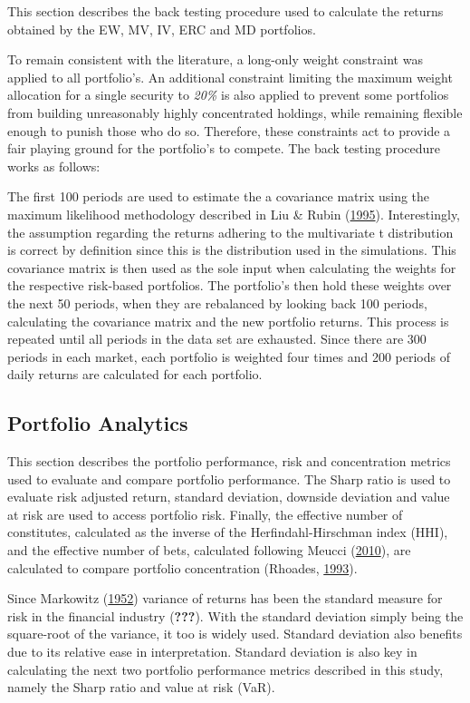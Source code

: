 \documentclass[11pt,preprint, authoryear]{elsarticle}
\numberwithin{equation}{section}
\numberwithin{figure}{section}
\numberwithin{table}{section}
\begin{document}
This section describes the back testing procedure used to calculate the
returns obtained by the EW, MV, IV, ERC and MD portfolios.

To remain consistent with the literature, a long-only weight constraint
was applied to all portfolio's. An additional constraint limiting the
maximum weight allocation for a single security to \emph{20\%} is also
applied to prevent some portfolios from building unreasonably highly
concentrated holdings, while remaining flexible enough to punish those
who do so. Therefore, these constraints act to provide a fair playing
ground for the portfolio's to compete. The back testing procedure works
as follows:

The first 100 periods are used to estimate the a covariance matrix using
the maximum likelihood methodology described in Liu \& Rubin
(\protect\hyperlink{ref-liu1995}{1995}). Interestingly, the assumption
regarding the returns adhering to the multivariate t distribution is
correct by definition since this is the distribution used in the
simulations. This covariance matrix is then used as the sole input when
calculating the weights for the respective risk-based portfolios. The
portfolio's then hold these weights over the next 50 periods, when they
are rebalanced by looking back 100 periods, calculating the covariance
matrix and the new portfolio returns. This process is repeated until all
periods in the data set are exhausted. Since there are 300 periods in
each market, each portfolio is weighted four times and 200 periods of
daily returns are calculated for each portfolio.

\hypertarget{portfolio-analytics}{%
\subsection{Portfolio Analytics}\label{portfolio-analytics}}

This section describes the portfolio performance, risk and concentration
metrics used to evaluate and compare portfolio performance. The Sharp
ratio is used to evaluate risk adjusted return, standard deviation,
downside deviation and value at risk are used to access portfolio risk.
Finally, the effective number of constitutes, calculated as the inverse
of the Herfindahl-Hirschman index (HHI), and the effective number of
bets, calculated following Meucci
(\protect\hyperlink{ref-meucci2010}{2010}), are calculated to compare
portfolio concentration (Rhoades,
\protect\hyperlink{ref-rhoades1993}{1993}).

Since Markowitz (\protect\hyperlink{ref-markowitz}{1952}) variance of
returns has been the standard measure for risk in the financial industry
({\textbf{???}}). With the standard deviation simply being the
square-root of the variance, it too is widely used. Standard deviation
also benefits due to its relative ease in interpretation. Standard
deviation is also key in calculating the next two portfolio performance
metrics described in this study, namely the Sharp ratio and value at
risk (VaR).
\end{document}
